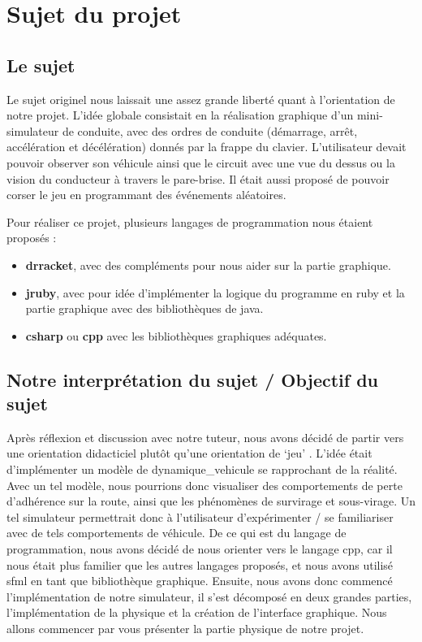 \section{Sujet du projet}\label{sec:sujet-du-projet}
\subsection{Le sujet}\label{subsec:le-sujet}
Le sujet originel nous laissait une assez grande liberté quant à l'orientation de notre projet.
L'idée globale consistait en la réalisation graphique d'un mini-simulateur de conduite, avec des ordres de conduite (démarrage, arrêt, accélération et décélération) donnés par la frappe du clavier.
L'utilisateur devait pouvoir observer son véhicule ainsi que le circuit avec une vue du dessus ou la vision du conducteur à travers le pare-brise.
Il était aussi proposé de pouvoir \og corser\fg{} le jeu en programmant des événements aléatoires.

Pour réaliser ce projet, plusieurs langages de programmation nous étaient proposés :
\begin{itemize}
    \item \textbf{\gls{drracket}}, avec des compléments pour nous aider sur la partie graphique.
    \item \textbf{\gls{jruby}}, avec pour idée d'implémenter la logique du programme en \gls{ruby} et la partie graphique avec des bibliothèques de \gls{java}.
    \item \textbf{\gls{csharp}} ou \textbf{\gls{cpp}} avec les bibliothèques graphiques adéquates.
\end{itemize}


\subsection{Notre interprétation du sujet / Objectif du sujet}\label{subsec:notre-interpretation-du-sujet-/-objectif-du-sujet}
Après réflexion et discussion avec notre tuteur, nous avons décidé de partir vers une orientation didacticiel plutôt qu'une \og orientation de `jeu' \fg{}.
L'idée était d'implémenter un modèle de \gls{dynamique_vehicule} se rapprochant de la réalité.
Avec un tel modèle, nous pourrions donc visualiser des comportements de perte d'adhérence sur la route, ainsi que les phénomènes de survirage et sous-virage.
Un tel simulateur permettrait donc à l'utilisateur d'expérimenter / se familiariser avec de tels comportements de véhicule.
De ce qui est du langage de programmation, nous avons décidé de nous orienter vers le langage \gls{cpp}, car il nous était plus familier que les autres langages proposés, et nous avons utilisé \gls{sfml} en tant que bibliothèque graphique.
Ensuite, nous avons donc commencé l'implémentation de notre simulateur, il s'est décomposé en deux grandes parties, l'implémentation de la physique et la création de l'interface graphique.
Nous allons commencer par vous présenter la partie physique de notre projet.

\newpage